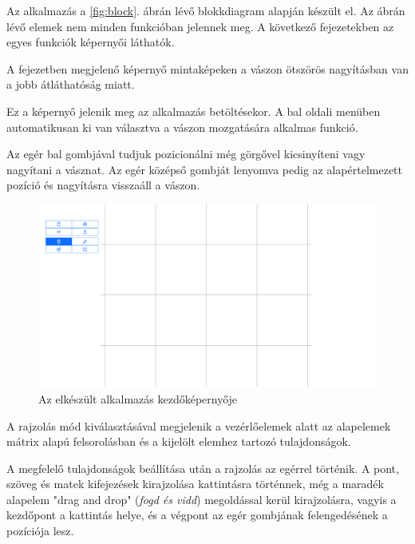 

Az alkalmazás a \ref{fig:block}. ábrán lévő blokkdiagram alapján készült el. Az ábrán lévő elemek nem minden funkcióban jelennek meg. A következő fejezetekben az egyes funkciók képernyői láthatók. 

A fejezetben megjelenő képernyő mintaképeken a vászon ötszörös nagyításban van a jobb átláthatóság miatt.


Ez a képernyő jelenik meg az alkalmazás betöltésekor. A bal oldali menüben automatikusan ki van választva a vászon mozgatására alkalmas funkció.

Az egér bal gombjával tudjuk pozicionálni még görgővel kicsinyíteni vagy nagyítani a vásznat. Az egér középső gombját lenyomva pedig az alapértelmezett pozíció és nagyításra visszaáll a vászon.

\begin{figure}[!h]
	\label{fig:canvas}
	\includegraphics[width=\textwidth]{images/editor_canvas.png}
	\caption{Az elkészült alkalmazás kezdőképernyője}
\end{figure}


A rajzolás mód kiválasztásával megjelenik a vezérlőelemek alatt az alapelemek mátrix alapú felsorolásban és a kijelölt elemhez tartozó tulajdonságok.

A megfelelő tulajdonságok beállítása után a rajzolás az egérrel történik. A pont, szöveg és matek kifejezések kirajzolása kattintásra történnek, még a maradék alapelem "drag and drop" (\textit{fogd és vidd}) megoldással kerül kirajzolásra, vagyis a kezdőpont a kattintás helye, és a végpont az egér gombjának felengedésének a pozíciója lesz.

